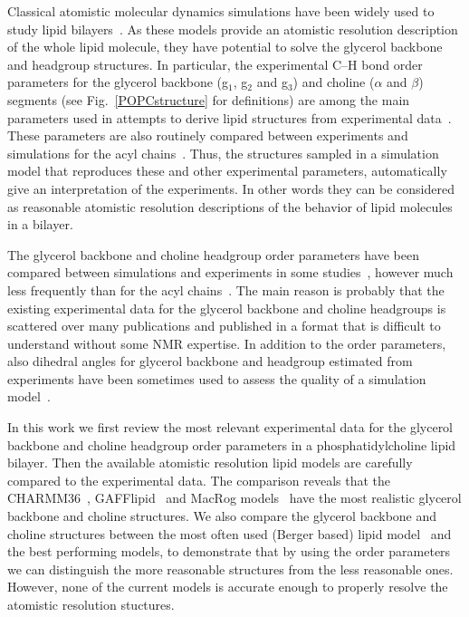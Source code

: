 \documentclass[journal=jacsat,manuscript=article]{achemso}
\begin{document}
Classical atomistic molecular dynamics simulations have been widely used to study  
lipid bilayers~\cite{tieleman97,klauda08,edholm08,tieleman10,piggot12,rabinovich13}. As these models provide an atomistic
resolution description of the whole lipid molecule, they have potential to solve the glycerol backbone and 
headgroup structures. In particular, the experimental C--H bond order parameters for the glycerol backbone 
(g$_1$, g$_2$ and g$_3$) and choline ($\alpha$ and $\beta$) segments (see Fig.~\ref{POPCstructure} for definitions) are among the main parameters used in
attempts to derive lipid structures from experimental data~\cite{seelig77b,skarjune79,jacobs80,davis83,akutsu91,hong95b,semchyschyn04}.
These parameters are also routinely compared between experiments and simulations for the acyl chains~\cite{tieleman97,klauda08,edholm08,tieleman10,piggot12}.
Thus, the structures sampled in a simulation model that reproduces these and other experimental parameters, automatically
give an interpretation of the experiments. In other words they can be considered as reasonable atomistic resolution descriptions of
the behavior of lipid molecules in a bilayer.

The glycerol backbone and choline headgroup order parameters have been compared between simulations and experiments
in some studies~\cite{shinoda97,hogberg08,castro08,klauda10,kapla12,dickson12,poger12,ferreira13,chowdhary13,maciejewski14}, 
however much less frequently than for the acyl  chains~\cite{tieleman97,klauda08,edholm08,tieleman10,piggot12}.
The main reason is probably that the existing experimental data for the glycerol backbone
and choline headgroups is scattered over many publications and published in a format that is difficult to understand without some NMR expertise. 
In addition to the order parameters, also dihedral angles for glycerol backbone and headgroup estimated from experiments have been sometimes used to 
assess the quality of a simulation model~\cite{robinson94,essex94,kothekar96,hyvonen97,shinoda97,duong99}.

In this work we first review the most relevant experimental data for the glycerol backbone and choline headgroup order parameters
in a phosphatidylcholine lipid bilayer. Then the available atomistic resolution lipid models are carefully compared to the 
experimental data. The comparison reveals that the CHARMM36~\cite{klauda10}, GAFFlipid~\cite{dickson12} and MacRog models~\cite{maciejewski14}
have the most realistic glycerol backbone and choline structures. We also compare the glycerol backbone and choline 
structures between the most often used (Berger based) lipid model~\cite{berger97} 
and the best performing models, to demonstrate that by using the 
order parameters we can distinguish the more reasonable structures from the less reasonable ones. However, none of the current models 
is accurate enough to properly resolve the atomistic resolution stuctures.
\end{document}
